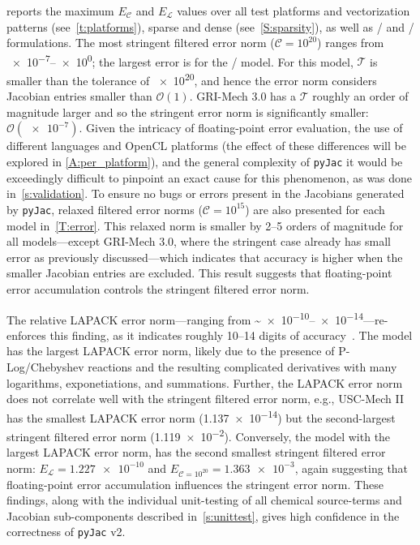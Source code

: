 \documentclass[12pt,number,sort&compress,preprint]{elsarticle}
\newcommand{\revise}[1]{{\sloppy\textcolor{RoyalPurple}{#1}}}  %
\begin{document}
 reports the maximum $E_{\mathcal{C}}$ and $E_{\mathcal{L}}$ values over all test platforms and vectorization patterns (see~\cref{t:platforms}), sparse and dense (see~\cref{S:sparsity}), as well as \conp/ and \conv/ formulations.
The most stringent filtered error norm ($\mathcal{C} = 10^{20}$) ranges from \numrange[retain-zero-exponent=true]{e-7}{e0}; the largest error is for the \slash{} model.
For this model, $\mathcal{T}$ is smaller than the tolerance of \num{e20}, and hence the error norm considers Jacobian entries smaller than $\mathcal{O}(1)$.
GRI-Mech 3.0 has a $\mathcal{T}$ roughly an order of magnitude larger and so the stringent error norm is significantly smaller: $\mathcal{O}(\num{e-7})$.
Given the intricacy of floating-point error evaluation, the use of different languages and OpenCL platforms (the effect of these differences will be explored in \cref{A:per_platform}), and the general complexity of \texttt{pyJac} it would be exceedingly difficult to pinpoint an exact cause for this phenomenon, as was done in~\cref{s:validation}.
To ensure no bugs or errors present in the Jacobians generated by \texttt{pyJac}, relaxed filtered error norms ($\mathcal{C} = 10^{15}$) are also presented for each model in~\cref{T:error}.
This relaxed norm is smaller by \numrange{2}{5} orders of magnitude for all models---except GRI-Mech 3.0, where the stringent case already has small error as previously discussed---which indicates that accuracy is higher when the smaller Jacobian entries are excluded.
\revise{This result suggests that floating-point error accumulation controls the stringent filtered error norm.}

The relative LAPACK error norm---ranging from \textasciitilde\numrange{e-10}{e-14}---re-enforces this finding, as it indicates roughly \numrange{10}{14} digits of accuracy~\cite{Anderson:1999aa}.
The  model has the largest LAPACK error norm, likely due to the presence of P-Log\slash Chebyshev reactions and the resulting complicated derivatives with many logarithms, exponetiations, and summations.
Further, the LAPACK error norm does not correlate well with the stringent filtered error norm, e.g., USC-Mech II has the smallest LAPACK error norm (\num{1.137e-14}) but the second-largest stringent filtered error norm (\num{1.119e-2}).
\revise{Conversely, the model with the largest LAPACK error norm, \ce{iC5H11OH} has the second smallest stringent filtered error norm: $E_{\mathcal{L}} = \num{1.227e-10}$ and $E_{\mathcal{C} = 10^{20}} = \num{1.363e-3}$, again suggesting that floating-point error accumulation influences the stringent error norm.}
These findings, along with the individual unit-testing of all chemical source-terms and Jacobian sub-components described in~\cref{s:unittest}, gives high confidence in the correctness of \revise{\texttt{pyJac} v2}.
\end{document}
